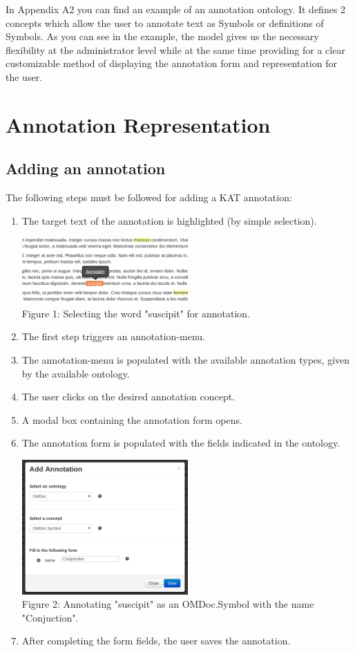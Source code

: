 \documentclass[a4paper, 12pt, notitlepage]{report}
\begin{document}
In Appendix A2 you can find an example of an annotation ontology. It defines 2 concepts which allow the user to annotate text as Symbols or
definitions of Symbols. As you can see in the example, the model gives us the necessary flexibility at the administrator level
while at the same time providing for a clear customizable method of displaying the
annotation form and representation for the user.

\section{Annotation Representation}

\subsection{Adding an annotation}

The following steps must be followed for adding a KAT annotation:
\begin{enumerate}
\item The target text of the annotation is highlighted (by simple selection).
\begin{center}
  \includegraphics[width=2.5in]{annotate.png} \\
  \tiny{Figure 1: Selecting the word "suscipit" for annotation.}
\end{center}

\item The first step triggers an annotation-menu.
\item The annotation-menu is populated with the available annotation types, given by the
  available ontology.
\item The user clicks on the desired annotation concept.
\item A modal box containing the annotation form opens.
\item The annotation form is populated with the fields indicated in the ontology.
\begin{center}
 \includegraphics[width=2.5in]{add-symbol.png} \\
 \tiny{Figure 2: Annotating "suscipit" as an OMDoc.Symbol with the name "Conjuction".}
\end{center}

\item After completing the form fields, the user saves the annotation.
\end{enumerate}
\end{document}
